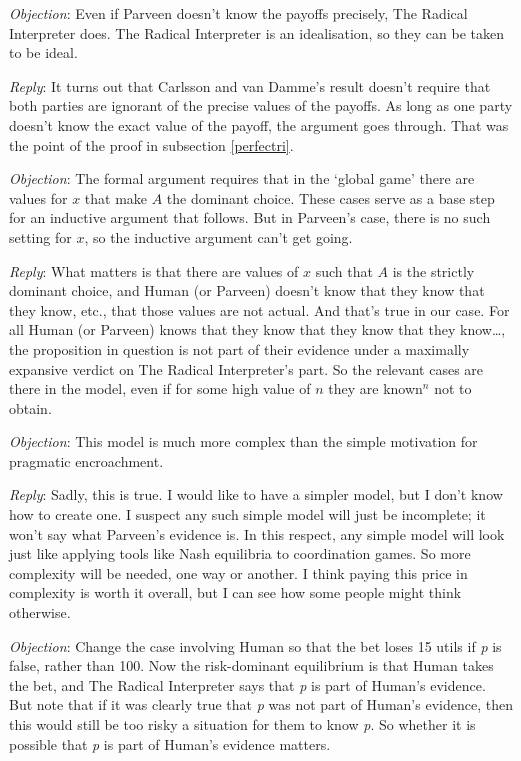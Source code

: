 \documentclass[11pt,]{book}
\begin{document}
\emph{Objection}: Even if Parveen doesn't know the payoffs precisely, The Radical Interpreter does. The Radical Interpreter is an idealisation, so they can be taken
to be ideal.

\emph{Reply}: It turns out that Carlsson and van Damme's result doesn't require that both parties are ignorant of the precise values of the payoffs. As long as one party doesn't know the exact value of the payoff, the argument goes through. That was the point of the proof in subsection \ref{perfectri}.

\emph{Objection}: The formal argument requires that in the `global game' there are values for \(x\) that make \(A\) the dominant choice. These cases serve as a base step for an inductive argument that follows. But in Parveen's case, there is no such setting for \(x\), so the inductive argument can't get going.

\emph{Reply}: What matters is that there are values of \(x\) such that \(A\) is the strictly dominant choice, and Human (or Parveen) doesn't know that they know that they know, etc., that those values are not actual. And that's true in our case. For all Human (or Parveen) knows that they know that they know that they know\ldots{}, the proposition in question is not part of their evidence under a maximally expansive verdict on The Radical Interpreter's part. So the relevant cases are there in the model, even if for some high value of \(n\) they are known\(^n\) not to obtain.

\emph{Objection}: This model is much more complex than the simple motivation for pragmatic encroachment.

\emph{Reply}: Sadly, this is true. I would like to have a simpler model, but I don't know how to create one. I suspect any such simple model will just be incomplete; it won't say what Parveen's evidence is. In this respect, any simple model will look just like applying tools like Nash equilibria to coordination games. So more complexity will be needed, one way or another. I think paying this price in complexity is worth it overall, but I can see how some people might think otherwise.

\emph{Objection}: Change the case involving Human so that the bet loses 15 utils if \emph{p} is false, rather than 100. Now the risk-dominant equilibrium is that Human takes the bet, and The Radical Interpreter says that \emph{p} is part of Human's evidence. But note that if it was clearly true that \emph{p} was not part of Human's evidence, then this would still be too risky a situation for them to know \emph{p}. So whether it is possible that \emph{p} is part of Human's evidence matters.
\end{document}
